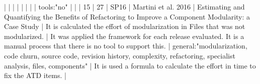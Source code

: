 |    |            |      |                                                                      |                                                                                                                                                                          |                                                                                                                                                                                                                                                            |                                                                                                                                                                                                                                                                      |  tools:"no"                                                                                                                                                                                                                                                                                              |                                                                                                                                                                                                                                                                                                                                                                                                                                                                                              |
| 15 |         27 | SP16 | Martini et al. 2016                                                  | Estimating and Quantifying the Benefits of Refactoring to Improve a Component Modularity: a Case Study                                                                   | It is calculated the effort of modularization in Files that was not modularized.                                                                                                                                                                         | It was applied the framework for each release evaluated. It is a manual process that there is no tool to support this.                                                                                                                                             | general:"modularization, code churn, source code, revision history, complexity, refactoring, specialist analysis, files, components"                                                                                                                                                                     | It is used a formula to calculate the effort in time to fix the ATD items.                                                                                                                                                                                                                                                                                                                                                                                                               |

